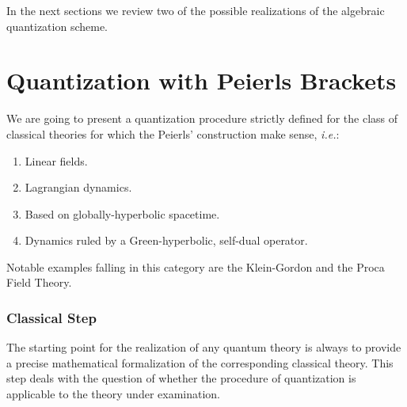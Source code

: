 \documentclass[Main]{subfiles}
\begin{document}
In the next sections we review two of the possible realizations of the algebraic quantization scheme.

\section{Quantization with Peierls Brackets}
	We are going to present a quantization procedure strictly defined for the class of classical theories for which the Peierls' construction make sense, \textit{i.e.}:
	\begin{enumerate}
		\item Linear fields.
		\item Lagrangian dynamics.
		\item Based on globally-hyperbolic spacetime.
		\item Dynamics ruled by a Green-hyperbolic, self-dual operator.
	\end{enumerate}
	Notable examples falling in this category are the
	Klein-Gordon and the  Proca Field Theory\cite{Benini}.

	\subsubsection{Classical Step}%
	The starting point for the realization of any quantum theory is always to provide a precise mathematical formalization of the corresponding classical theory.
	This step deals with the question of whether the procedure of quantization is applicable to the theory under examination.
\end{document}
